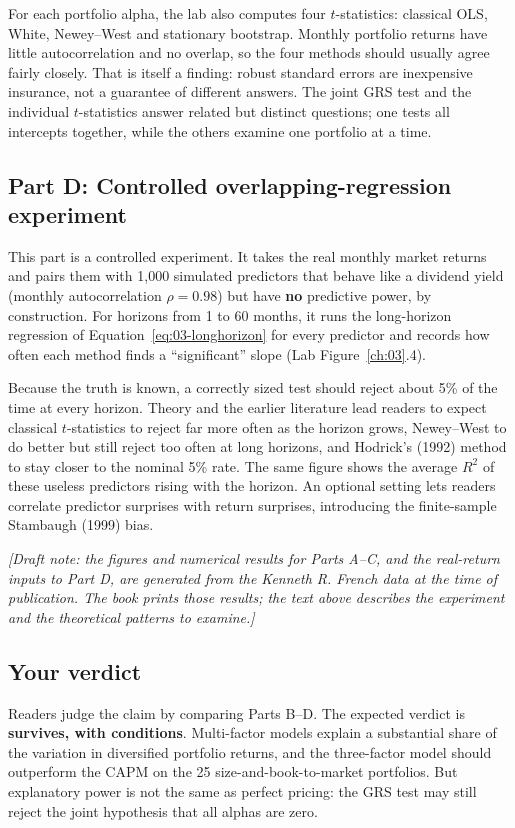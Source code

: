 For each portfolio alpha, the lab also computes four $t$-statistics: classical OLS, White, Newey--West and stationary bootstrap. Monthly portfolio returns have little autocorrelation and no overlap, so the four methods should usually agree fairly closely. That is itself a finding: robust standard errors are inexpensive insurance, not a guarantee of different answers. The joint GRS test and the individual $t$-statistics answer related but distinct questions; one tests all intercepts together, while the others examine one portfolio at a time.

\subsection*{Part D: Controlled overlapping-regression experiment}

This part is a controlled experiment. It takes the real monthly market returns and pairs them with 1,000 simulated predictors that behave like a dividend yield (monthly autocorrelation $\rho=0.98$) but have \textbf{no} predictive power, by construction. For horizons from 1 to 60 months, it runs the long-horizon regression of Equation~\eqref{eq:03-longhorizon} for every predictor and records how often each method finds a ``significant'' slope (Lab Figure~\ref{ch:03}.4).

Because the truth is known, a correctly sized test should reject about 5\% of the time at every horizon. Theory and the earlier literature lead readers to expect classical $t$-statistics to reject far more often as the horizon grows, Newey--West to do better but still reject too often at long horizons, and Hodrick's (1992) method to stay closer to the nominal 5\% rate. The same figure shows the average $R^2$ of these useless predictors rising with the horizon. An optional setting lets readers correlate predictor surprises with return surprises, introducing the finite-sample Stambaugh (1999) bias.

\emph{[Draft note: the figures and numerical results for Parts A--C, and the real-return inputs to Part D, are generated from the Kenneth R. French data at the time of publication. The book prints those results; the text above describes the experiment and the theoretical patterns to examine.]}

\subsection*{Your verdict}

Readers judge the claim by comparing Parts B--D. The expected verdict is \textbf{survives, with conditions}. Multi-factor models explain a substantial share of the variation in diversified portfolio returns, and the three-factor model should outperform the CAPM on the 25 size-and-book-to-market portfolios. But explanatory power is not the same as perfect pricing: the GRS test may still reject the joint hypothesis that all alphas are zero.


